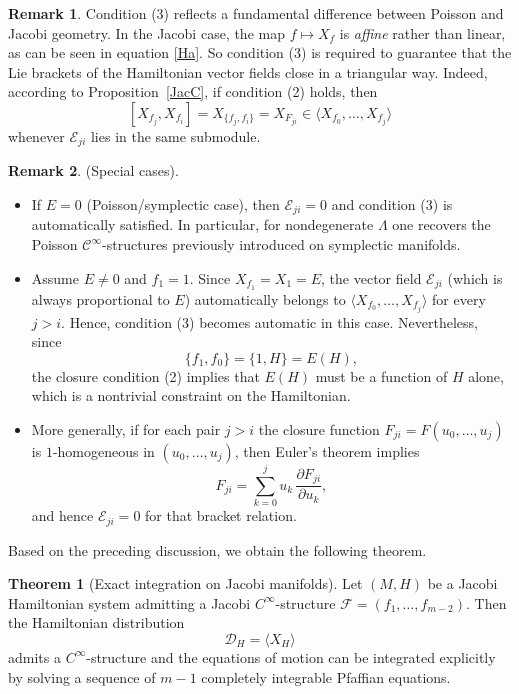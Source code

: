 \documentclass{article}
\theoremstyle{remark}
\theoremstyle{definition}
\newtheorem{theorem}{Theorem}[section]
\newtheorem{remark}{Remark}[section]
\newcommand{\cinf}{$\mathcal{C}^{\infty}$}
\begin{document}
\begin{remark}\label{aboutC3}
Condition \textup{(3)} reflects a fundamental difference between Poisson and Jacobi geometry. 
In the Jacobi case, the map $f \mapsto X_f$ is \emph{affine} rather than linear, as can be seen in equation \eqref{Ha}. So condition \textup{(3)} is required to guarantee that the Lie brackets of the Hamiltonian vector fields close in a triangular way. Indeed, according to Proposition~\ref{JacC}, if condition \textup{(2)} holds, then
\[
[X_{f_j},X_{f_i}]=X_{\{f_j,f_i\}}=X_{F_{ji}}\in \langle X_{f_0},\dots,X_{f_j}\rangle
\]
whenever $\mathcal E_{ji}$ lies in the same submodule. 
\end{remark}

\begin{remark}
\textup{(Special cases).}
\begin{itemize}
\item If $E=0$ (Poisson/symplectic case), then $\mathcal E_{ji}=0$ and condition \textup{(3)} is automatically satisfied. In particular, for nondegenerate $\Lambda$ one recovers the Poisson \cinf-structures previously introduced on symplectic manifolds.

\item Assume $E\neq 0$ and $f_1=1$. Since $X_{f_1}=X_1=E$, the vector field $\mathcal E_{ji}$ (which is always proportional to $E$) automatically belongs to $\langle X_{f_0},\dots,X_{f_j}\rangle$ for every $j>i$. Hence, condition \textup{(3)} becomes automatic in this case. Nevertheless, since 
$$
\{f_1,f_0\}=\{1,H\}=E(H),
$$
the closure condition \textup{(2)} implies that $E(H)$ must be a function of $H$ alone, which is a nontrivial constraint on the Hamiltonian.

\item More generally, if for each pair $j>i$ the closure function $F_{ji}=F(u_0,\dots,u_j)$ is $1$-homogeneous in $(u_0,\dots,u_j)$, then Euler's theorem implies
\[
F_{ji}=\sum_{k=0}^j u_k\,\frac{\partial F_{ji}}{\partial u_k},
\]
and hence $\mathcal E_{ji}=0$ for that bracket relation. 
\end{itemize}
\end{remark}


Based on the preceding discussion, we obtain the following theorem.


\begin{theorem}[Exact integration on Jacobi manifolds]\label{thm:jacobi-main}
Let $(M,H)$ be a Jacobi Hamiltonian system admitting a Jacobi
$C^\infty$-structure $\mathcal F=(f_1,\dots,f_{m-2})$. Then the Hamiltonian distribution
\[
\mathcal D_H=\langle X_H\rangle
\]
admits a $C^\infty$-structure and the equations of motion can be integrated
explicitly by solving a
sequence of $m-1$ completely integrable Pfaffian equations.
\end{theorem}
\end{document}
